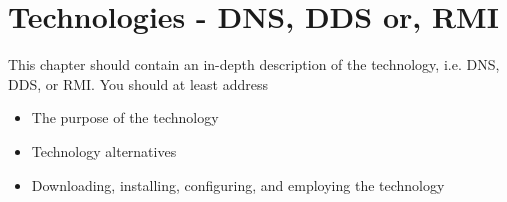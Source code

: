 \chapter{Technologies - DNS, DDS or, RMI}
This chapter should contain an in-depth description of the technology,
i.e. DNS, DDS, or RMI. You should at least address
\begin{itemize}
\item The purpose of the technology
\item Technology alternatives
\item Downloading, installing, configuring, and employing the technology




\end{itemize}